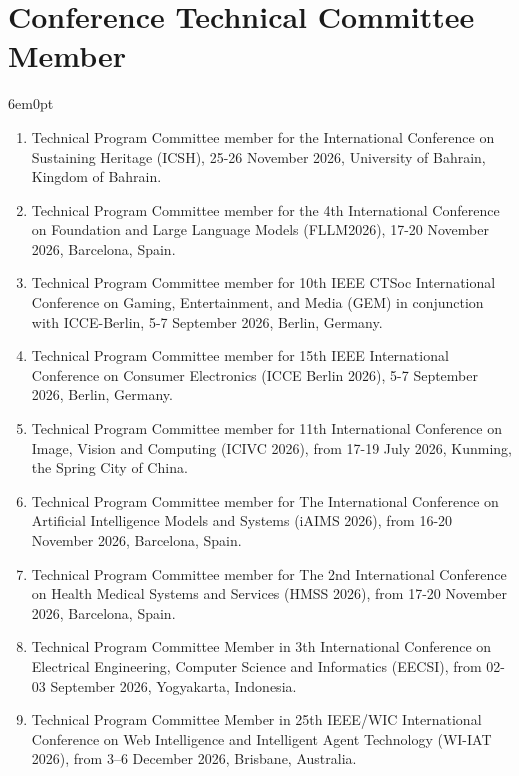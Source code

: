 \documentclass[11pt,a4paper]{moderncv}
\begin{document}
\section{\textbf{Conference Technical Committee Member}}

\begin{adjustwidth}{6em}{0pt}
	\begin{enumerate}
		
		
		\item Technical Program Committee member for the International Conference on Sustaining Heritage (ICSH), 25-26 November 2026, University of Bahrain, Kingdom of Bahrain.
		
		\item Technical Program Committee member for the 4th International Conference on Foundation and Large Language Models (FLLM2026), 17-20 November 2026, Barcelona, Spain.
		
		\item Technical Program Committee member for 10th IEEE CTSoc International Conference on Gaming, Entertainment, and Media (GEM) in conjunction with ICCE-Berlin, 5-7 September 2026, Berlin, Germany.
		
		\item Technical Program Committee member for 15th IEEE International Conference on Consumer Electronics (ICCE Berlin 2026), 5-7 September 2026, Berlin, Germany.
		
		\item Technical Program Committee member for 11th International Conference on Image, Vision and Computing (ICIVC 2026), from 17-19 July 2026, Kunming, the Spring City of China.
		
		\item Technical Program Committee member for The International Conference on Artificial Intelligence Models and Systems (iAIMS 2026), from 16-20 November 2026, Barcelona, Spain. 
		
		\item Technical Program Committee member for The 2nd International Conference on Health Medical Systems and Services (HMSS 2026), from 17-20 November 2026, Barcelona, Spain. 
		
		\item Technical Program Committee Member in 3th International Conference on Electrical Engineering, Computer Science and Informatics (EECSI), from 02-03 September 2026, Yogyakarta, Indonesia. 
				
		\item Technical Program Committee Member in 25th IEEE/WIC International Conference on Web Intelligence and Intelligent Agent Technology (WI-IAT 2026), from 3–6 December 2026, Brisbane, Australia.
		

\end{enumerate}
\end{adjustwidth}
\end{document}
